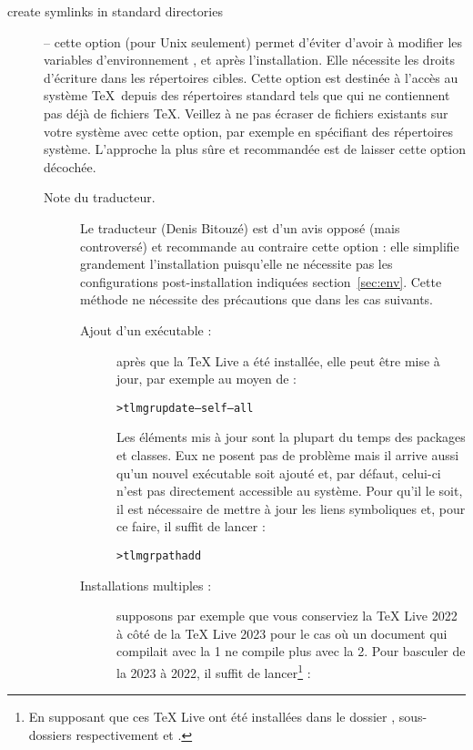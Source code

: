 \documentclass[german, english, french]{article}
\renewcommand{\TL}{\TeX{} Live\xspace}%
\begin{document}
\begin{description}
\item[create symlinks in standard directories] -- cette option (pour Unix
  seulement) permet d'éviter d'avoir à modifier les variables d'environnement
  ,  et  après
  l'installation. Elle nécessite les droits d'écriture dans les répertoires
  cibles. Cette option est destinée à l'accès au système \TeX\ depuis des
  répertoires standard tels que  qui ne contiennent pas
  déjà de fichiers \TeX. Veillez à ne pas écraser de fichiers existants sur
  votre système avec cette option, par exemple en spécifiant des répertoires
  système. L'approche la plus sûre et recommandée est de laisser cette option
  décochée.
  \begin{description}
  \item[Note du traducteur.] Le traducteur (Denis Bitouzé) est d'un avis
    opposé (mais controversé) et recommande au contraire cette option : elle
    simplifie grandement l'installation puisqu'elle ne nécessite pas les
    configurations post-installation indiquées section~\ref{sec:env}. Cette
    méthode ne nécessite des précautions que dans les cas suivants.
    \begin{description}
    \item[Ajout d'un exécutable :] après que la \TL{} a été installée, elle peut
      être mise à jour, par exemple au moyen de :
\begin{alltt}
> tlmgr update --self --all
\end{alltt}
      Les éléments mis à jour sont la plupart du temps des packages et
      classes. Eux ne posent pas de problème mais il arrive aussi qu'un nouvel
      exécutable soit ajouté et, par défaut, celui-ci n'est pas directement
      accessible au système. Pour qu'il le soit, il est nécessaire de mettre
      à jour les liens symboliques et, pour ce faire, il suffit de lancer :
\begin{alltt}
> tlmgr path add
\end{alltt}
    \item[Installations multiples :] supposons par exemple que vous conserviez
      la \TL{} 2022 à côté de la \TL{} 2023 pour le cas où un document qui
      compilait avec la 1\iere{} ne compile plus avec la 2\ieme{}. Pour basculer
      de la 2023 à 2022, il suffit de lancer\footnote{En supposant que
        ces \TL{} ont été installées dans le dossier
        , sous-dossiers respectivement
         et .} :
\begin{alltt}

\end{alltt}
\end{description}
\end{description}
\end{description}
\end{document}
